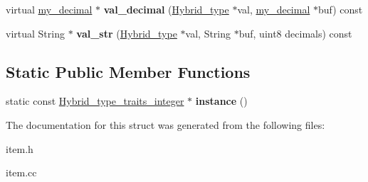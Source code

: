 \begin{DoxyCompactItemize}
\item 
\mbox{\label{structHybrid__type__traits__integer_aa3a98c10f3cdbe1116ee2cceb4c72a3b}} 
virtual \mbox{\hyperlink{classmy__decimal}{my\+\_\+decimal}} $\ast$ {\bfseries val\+\_\+decimal} (\mbox{\hyperlink{structHybrid__type}{Hybrid\+\_\+type}} $\ast$val, \mbox{\hyperlink{classmy__decimal}{my\+\_\+decimal}} $\ast$buf) const
\item 
\mbox{\label{structHybrid__type__traits__integer_a005e8436d72f723e861dbc6358f7d8aa}} 
virtual String $\ast$ {\bfseries val\+\_\+str} (\mbox{\hyperlink{structHybrid__type}{Hybrid\+\_\+type}} $\ast$val, String $\ast$buf, uint8 decimals) const
\end{DoxyCompactItemize}
\subsection*{Static Public Member Functions}
\begin{DoxyCompactItemize}
\item 
\mbox{\label{structHybrid__type__traits__integer_a5bc9ada1ca2db599245a17d18eb98faf}} 
static const \mbox{\hyperlink{structHybrid__type__traits__integer}{Hybrid\+\_\+type\+\_\+traits\+\_\+integer}} $\ast$ {\bfseries instance} ()
\end{DoxyCompactItemize}


The documentation for this struct was generated from the following files\+:\begin{DoxyCompactItemize}
\item 
item.\+h\item 
item.\+cc\end{DoxyCompactItemize}
